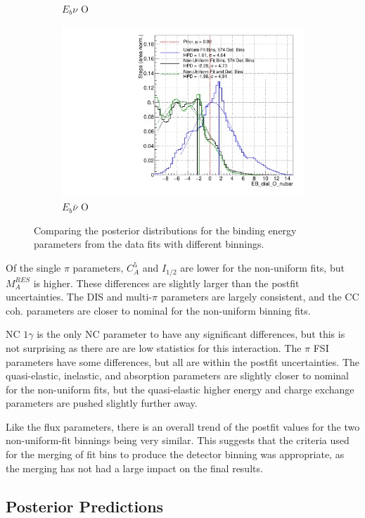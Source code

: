 \begin{figure}[!htbp]
\begin{subfigure}{.48\textwidth}
  \caption{$E_{b}\nu$ O}\label{fig:polyEbOnu}
\end{subfigure}
\begin{subfigure}{.48\textwidth}
  \centering
  \includegraphics[width=0.73\linewidth]{figs/PolyComp_EB_dial_O_nubar}
  \caption{$E_{b}\bar{\nu}$ O}
\end{subfigure}
\caption{Comparing the posterior distributions for the binding energy parameters from the data fits with different binnings.}
\label{fig:polyEbdata}
\end{figure}

Of the single $\pi$ parameters, $C_A^{5}$ and $I_{1/2}$ are lower for the non-uniform fits, but $M_A^{RES}$ is higher. These differences are slightly larger than the postfit uncertainties. The DIS and multi-$\pi$ parameters are largely consistent, and the CC coh. parameters are closer to nominal for the non-uniform binning fits.

NC $1\gamma$ is the only NC parameter to have any significant differences, but this is not surprising as there are are low statistics for this interaction. The $\pi$ FSI parameters have some differences, but all are within the postfit uncertainties. The quasi-elastic, inelastic, and absorption parameters are slightly closer to nominal for the non-uniform fits, but the quasi-elastic higher energy and charge exchange parameters are pushed slightly further away.

Like the flux parameters, there is an overall trend of the postfit values for the two non-uniform-fit binnings being very similar. This suggests that the criteria used for the merging of fit bins to produce the detector binning was appropriate, as the merging has not had a large impact on the final results. 

\subsection{Posterior Predictions}

